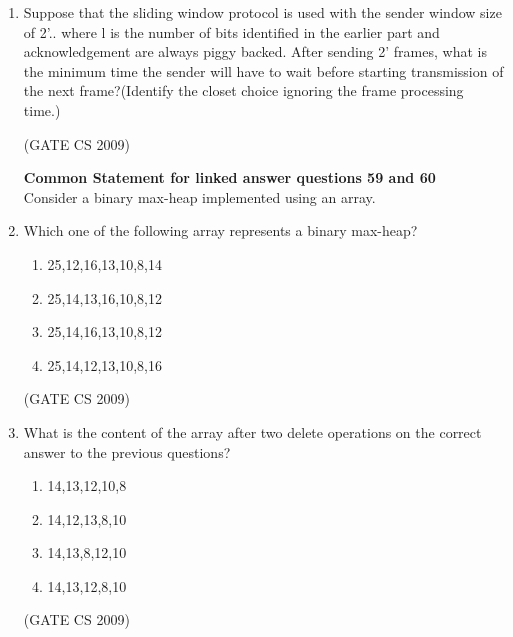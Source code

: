 \documentclass[a4paper, 11pt]{article}
\begin{document}
\begin{enumerate}
    \item Suppose that the sliding window protocol is used with the sender window size of 2'.. where l is the number of bits identified in the earlier part and acknowledgement are always piggy backed. After sending 2' frames, what is the minimum time the sender will have to wait before starting transmission of the next frame?(Identify the closet choice ignoring the frame processing time.)\\
    \begin{enumerate}
    \end{enumerate}
    
    \hfill (GATE CS 2009)
    
    {\Large \textbf{Common Statement for linked answer questions 59 and 60}} \\    
    Consider a binary max-heap implemented using an array.
    \item Which one of the following array represents a binary max-heap?\\
        \begin{enumerate} 
            \item {25,12,16,13,10,8,14}
            \item {25,14,13,16,10,8,12}
            \item {25,14,16,13,10,8,12}
            \item {25,14,12,13,10,8,16}
        \end{enumerate}
    \hfill (GATE CS 2009)
    \item What is the content of the array after two delete operations on the correct answer to the previous questions?\\
        \begin{enumerate} 
            \item {14,13,12,10,8}
            \item {14,12,13,8,10}
            \item {14,13,8,12,10}
            \item {14,13,12,8,10}
        \end{enumerate}
    \hfill (GATE CS 2009)
    

    
\end{enumerate}
\end{document}

